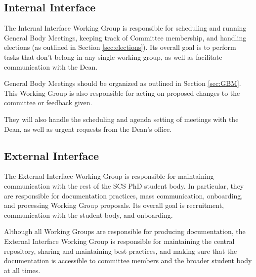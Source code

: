 \documentclass{article}
\begin{document}

\subsection{Internal Interface} %

The Internal Interface Working Group is responsible for scheduling and running General Body Meetings, keeping track of Committee membership, and handling elections (as outlined in Section \ref{sec:elections}). Its overall goal is to perform tasks that don't belong in any single working group, as well as facilitate communication with the Dean.

General Body Meetings should be organized as outlined in Section \ref{sec:GBM}. This Working Group is also responsible for acting on proposed changes to the committee or feedback given.

They will also handle the scheduling and agenda setting of meetings with the Dean, as well as urgent requests from the Dean's office.


\subsection{External Interface} %

The External Interface Working Group is responsible for maintaining communication with the rest of the SCS PhD student body. In particular, they are responsible for documentation practices, mass communication, onboarding, and processing Working Group proposals. Its overall goal is recruitment, communication with the student body, and onboarding.

Although all Working Groups are responsible for producing documentation, the External Interface Working Group is responsible for maintaining the central repository, sharing and maintaining best practices, and making sure that the documentation is accessible to committee members and the broader student body at all times. 
\end{document}

